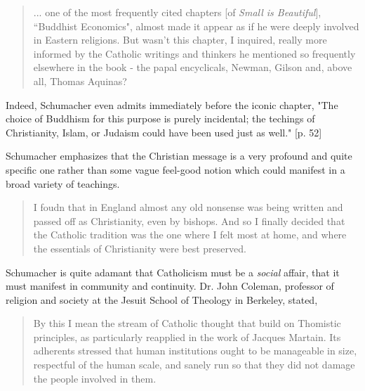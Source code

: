 \documentclass[10pt,letterpaper,openany]{book}
\begin{document}
\begin{quote}
... one of the most frequently cited chapters [of \textit{Small is Beautiful}], ``Buddhist Economics", almost made it appear as if he were deeply involved in Eastern religions. But wasn't this chapter, I inquired, really more informed by the Catholic writings and thinkers he mentioned so frequently elsewhere in the book - the papal encyclicals, Newman, Gilson and, above all, Thomas Aquinas?
\end{quote}

Indeed, Schumacher even admits immediately before the iconic chapter, "The choice of Buddhism for this purpose is purely incidental; the techings of Christianity, Islam, or Judaism could have been used just as well." [p. 52]


Schumacher emphasizes that the Christian message is a very profound and quite specific one rather than some vague feel-good notion which could manifest in a broad variety of teachings.

\begin{quote}
I foudn that in England almost any old nonsense was being written and passed off as Christianity, even by bishops. And so I finally decided that the Catholic tradition was the one where I felt most at home, and where the essentials of Christianity were best preserved.
\end{quote}

Schumacher is quite adamant that Catholicism must be a \textit{social} affair, that it must manifest in community and continuity. Dr. John Coleman, professor of religion and society at the Jesuit School of Theology in Berkeley, stated,

\begin{quote}
By this I mean the stream of Catholic thought that build on Thomistic principles, as particularly reapplied in the work of Jacques Martain. Its adherents stressed that human institutions ought to be manageable in size, respectful of the human scale, and sanely run so that they did not damage the people involved in them.
\end{quote}
\end{document}
